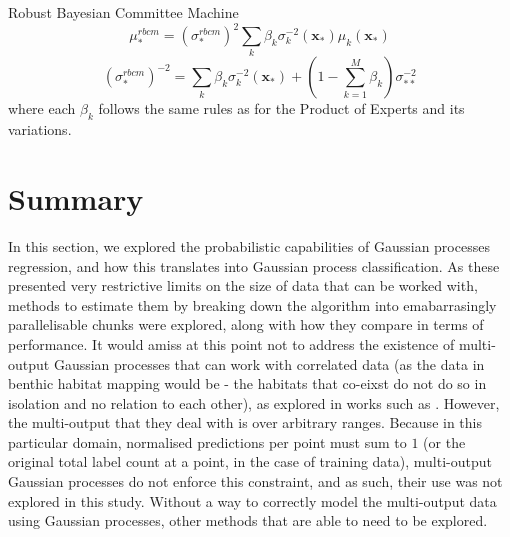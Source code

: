 Robust Bayesian Committee Machine
\begin{equation}
    \mu_*^{rbcm} = (\sigma_*^{rbcm})^2 \sum_k \beta_k \sigma_k^{-2} (\mathbf{x_*}) \mu_k (\mathbf{x_*})
\end{equation}
\begin{equation}
    (\sigma_*^{rbcm})^{-2} = \sum_k \beta_k \sigma_k^{-2} (\mathbf{x_*}) + (1-\sum_{k=1}^M \beta_k) \sigma_{**}^{-2}
\end{equation}
where each $\beta_k$ follows the same rules as for the Product of Experts and its variations.

\citep{deisenroth15}


\section{Summary}

In this section, we explored the probabilistic capabilities of Gaussian processes regression, and how this translates into Gaussian process classification. As these presented very restrictive limits on the size of data that can be worked with, methods to estimate them by breaking down the algorithm into emabarrasingly parallelisable chunks were explored, along with how they compare in terms of performance. It would amiss at this point not to address the existence of multi-output Gaussian processes that can work with correlated data (as the data in benthic habitat mapping would be - the habitats that co-eixst do not do so in isolation and no relation to each other), as explored in works such as . However, the multi-output that they deal with is over arbitrary ranges. Because in this particular domain, normalised predictions per point must sum to $1$ (or the original total label count at a point, in the case of training data), multi-output Gaussian processes do not enforce this constraint, and as such, their use was not explored in this study. Without a way to correctly model the multi-output data using Gaussian processes, other methods that are able to need to be explored.

